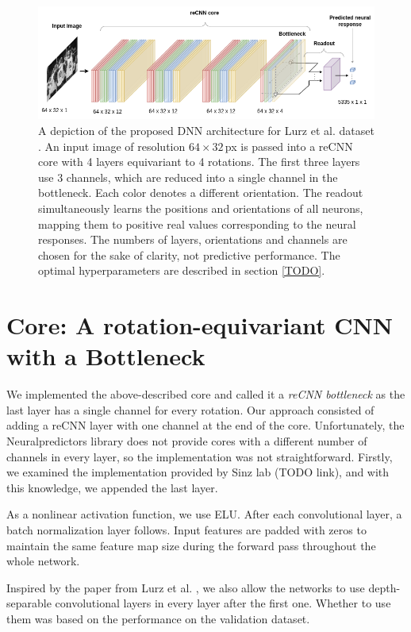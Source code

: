 \begin{figure}[H]\centering
	\includegraphics[width=145mm]{../img/architecture.png}
	\caption{A depiction of the proposed DNN architecture for Lurz et al. dataset \citep{lurz2021generalization}. An input image of resolution $64 \times 32$\,px is passed into a reCNN core with 4 layers equivariant to 4 rotations. The first three layers use 3 channels, which are reduced into a single channel in the bottleneck. Each color denotes a different orientation. The readout simultaneously learns the positions and orientations of all neurons, mapping them to positive real values corresponding to the neural responses. The numbers of layers, orientations and channels are chosen for the sake of clarity, not predictive performance. The optimal hyperparameters are described in section \ref{TODO}.}
	\label{img_architecture}
\end{figure}

\section{Core: A rotation-equivariant CNN with a Bottleneck}

We implemented the above-described core and called it a \emph{reCNN bottleneck} as the last layer has a single channel for every rotation. Our approach consisted of adding a reCNN layer with one channel at the end of the core. Unfortunately, the Neuralpredictors library does not provide cores with a different number of channels in every layer, so the implementation was not straightforward. Firstly, we examined the implementation provided by Sinz lab (TODO link), and with this knowledge, we appended the last layer.

As a nonlinear activation function, we use ELU. After each convolutional layer, a batch normalization layer follows. Input features are padded with zeros to maintain the same feature map size during the forward pass throughout the whole network.

Inspired by the paper from Lurz et al. \citep{lurz2021generalization}, we also allow the networks to use depth-separable convolutional layers \citep{chollet2017xception} in every layer after the first one. Whether to use them was based on the performance on the validation dataset.

